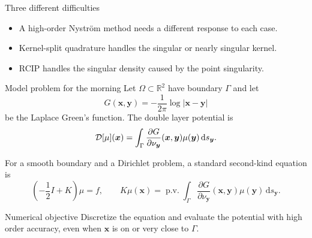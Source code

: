 \documentclass[aspectratio=169,11pt]{beamer}
\newcommand{\R}{\mathbb{R}}
\newcommand{\dd}{\,\mathrm d}
\newcommand{\x}{\bm{x}}
\newcommand{\y}{\bm{y}}
\begin{document}
\begin{frame}{Three different difficulties}
\small
\begin{center}
\end{center}

\vspace{-1mm}
\begin{itemize}
  \item A high-order Nystr\"om method needs a different response to each case.
  \item Kernel-split quadrature handles the singular or nearly singular kernel.
  \item RCIP handles the singular density caused by the point singularity.
\end{itemize}
\end{frame}

\begin{frame}{Model problem for the morning}
\small
Let $\Omega\subset\R^2$ have boundary $\Gamma$ and let
\[
  G(\x,\y)=-\frac{1}{2\pi}\log|\x-\y|
\]
be the Laplace Green's function.  The double layer potential is
\[
  \Dop[\mu](\x)
  =\int_\Gamma \frac{\partial G}{\partial \nu_{\y}}(\x,\y)
       \mu(\y)\dd s_{\y}.
\]

\vspace{2mm}
For a smooth boundary and a Dirichlet problem, a standard second-kind equation is
\[
  \left(-\frac12 I + K\right)\mu=f,\qquad
  K\mu(\x)=\operatorname{p.v.}\!\int_\Gamma
    \frac{\partial G}{\partial \nu_{\y}}(\x,\y)\mu(\y)\dd s_{\y}.
\]

\begin{block}{Numerical objective}
Discretize the equation and evaluate the potential with high order accuracy, even when $\x$ is on or very close to $\Gamma$.
\end{block}
\end{frame}
\end{document}
